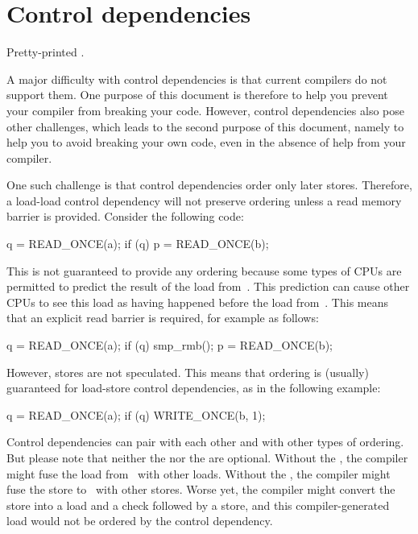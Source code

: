 \section{Control dependencies}
\label{sec:docs:Control dependencies}

\begin{Note}
  Pretty-printed .
\end{Note}

A major difficulty with control dependencies is that current compilers
do not support them.
One purpose of this document is therefore to help you prevent your
compiler from breaking your code.
However, control dependencies also pose other challenges, which leads to the
second purpose of this document, namely to help you to avoid breaking
your own code, even in the absence of help from your compiler.

One such challenge is that control dependencies order only later stores.
Therefore, a load-load control dependency will not preserve ordering
unless a read memory barrier is provided.
Consider the following code:

\begin{VerbatimU}
	q = READ_ONCE(a);
	if (q)
		p = READ_ONCE(b);
\end{VerbatimU}

This is not guaranteed to provide any ordering because some types of CPUs
are permitted to predict the result of the load from~.
This prediction can cause other CPUs to see this load as having happened
before the load from~.
This means that an explicit read barrier is required, for example as follows:

\begin{VerbatimU}
	q = READ_ONCE(a);
	if (q) {
		smp_rmb();
		p = READ_ONCE(b);
	}
\end{VerbatimU}

However, stores are not speculated.
This means that ordering is (usually) guaranteed for load-store control
dependencies, as in the following example:

\begin{VerbatimU}
	q = READ_ONCE(a);
	if (q)
		WRITE_ONCE(b, 1);
\end{VerbatimU}

Control dependencies can pair with each other and with other types
of ordering.
But please note that neither the  nor the 
are optional.
Without the , the compiler might fuse the load from~
with other loads.
Without the , the compiler might fuse the store to~
with other stores.
Worse yet, the compiler might convert the store into a load and a check followed
by a store, and this compiler-generated load would not be ordered by
the control dependency.

